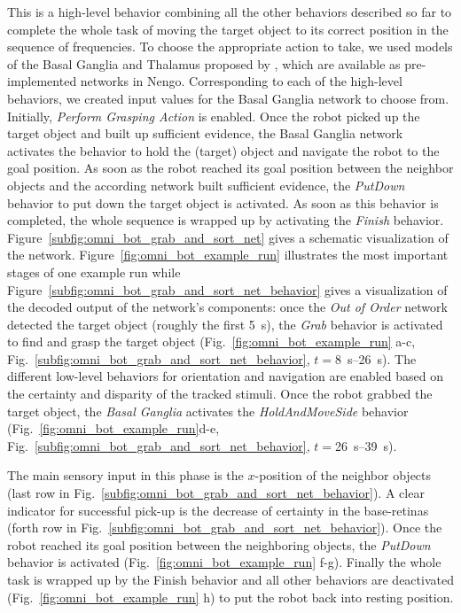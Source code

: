 This is a high-level behavior combining all the other behaviors described so far to complete the whole task of moving the target object to its correct position in the sequence of frequencies. 
To choose the appropriate action to take, we used models of the Basal Ganglia and Thalamus proposed by \textcite{Stewart2010}, which are available as pre-implemented networks in \ac{Nengo}.
Corresponding to each of the high-level behaviors, we created input values for the Basal Ganglia network to choose from. 
Initially, \emph{Perform Grasping Action} is enabled. 
Once the robot picked up the target object and built up sufficient evidence, the Basal Ganglia network activates the behavior to hold the (target) object and navigate the robot to the goal position. 
As soon as the robot reached its goal position between the neighbor objects and the according network built sufficient evidence, the \emph{PutDown} behavior to put down the target object is activated. 
As soon as this behavior is completed, the whole sequence is wrapped up by activating the \emph{Finish} behavior. 
Figure~\ref{subfig:omni_bot_grab_and_sort_net} gives a schematic visualization of the network. 
Figure~\ref{fig:omni_bot_example_run} illustrates the most important stages of one example run while Figure~\ref{subfig:omni_bot_grab_and_sort_net_behavior} gives a visualization of the decoded output of the network’s components: once the \emph{Out of Order} network detected the target object (roughly the first \SI{5}{\second}), the \emph{Grab} behavior is activated to find and grasp the target object (Fig.~\ref{fig:omni_bot_example_run} a-c,
Fig.~\ref{subfig:omni_bot_grab_and_sort_net_behavior}, $t=$\SIrange{8}{26}{\second}). 
The different low-level behaviors for orientation and navigation are enabled based on the certainty and disparity of the tracked stimuli. 
Once the robot grabbed the target object, the \emph{Basal Ganglia} activates the \emph{HoldAndMoveSide} behavior (Fig.~\ref{fig:omni_bot_example_run}d-e, Fig.~\ref{subfig:omni_bot_grab_and_sort_net_behavior}, $t=$\SIrange{26}{39}{\second}). 

The main sensory input in this phase is the $x$-position of the neighbor objects (last row in Fig.~\ref{subfig:omni_bot_grab_and_sort_net_behavior}). 
A clear indicator for successful pick-up is the decrease of certainty in the base-retinas (forth row in Fig.~\ref{subfig:omni_bot_grab_and_sort_net_behavior}). 
Once the robot reached its goal position between the neighboring objects, the \emph{PutDown} behavior is activated (Fig.~\ref{fig:omni_bot_example_run} f-g). 
Finally the whole task is wrapped up by the Finish behavior and all other behaviors are deactivated (Fig.~\ref{fig:omni_bot_example_run} h) to put the robot back into resting position.

